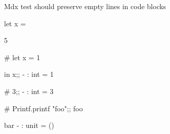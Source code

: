 Mdx test should preserve empty lines in code blocks

\begin{ocaml}


let x =

  5

\end{ocaml}

\begin{ocaml}

# let x = 1

  in x;;
- : int = 1


# 3;;
- : int = 3


# Printf.printf "foo\n\nbar\n";;
foo

bar
- : unit = ()
\end{ocaml}

